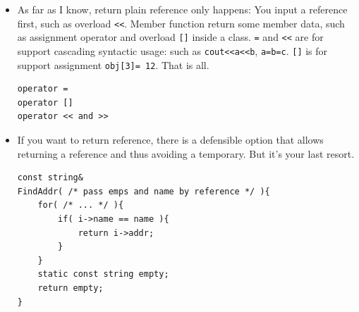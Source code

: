 \documentclass[a4paper,11pt,twoside]{book}
\begin{document}
\begin{itemize}
\begin{enumerate}
	\end{enumerate}
	
	\item As far as I know, return plain reference only happens: You input a reference first, such as overload \verb=<<=. Member function return some member data, such as  assignment operator and overload \verb=[]= inside a class. \texttt{=} and \texttt{<<} are for support cascading syntactic usage: such as \texttt{cout<<a<<b}, \texttt{a=b=c}.  \texttt{[]} is for support assignment \texttt{obj[3]= 12}.  That is all.

\begin{lstlisting}[numbers=none]
operator =
operator []
operator << and >>
\end{lstlisting}
	
	\item If you want to return reference,  there is a defensible option that allows returning a reference and thus avoiding a temporary. But it's your last resort.
\begin{lstlisting}[numbers=none]
const string&
FindAddr( /* pass emps and name by reference */ ){
	for( /* ... */ ){
		if( i->name == name ){
			return i->addr;
		}
	}
	static const string empty;
	return empty;
}
\end{lstlisting}
\end{itemize}
\end{document}
